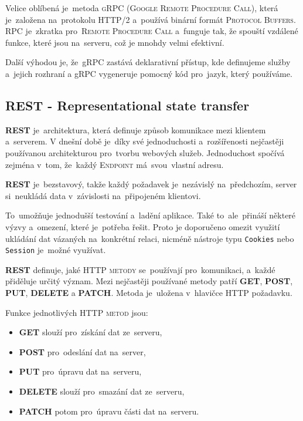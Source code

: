 \documentclass[14pt,a4paper]{article}
\begin{document}
        Velice oblíbená je~metoda \textsc{gRPC} (\textsc{Google Remote Procedure Call}), která je~založena na~protokolu HTTP/2 a~používá binární formát \textsc{Protocol Buffers}.
        RPC je~zkratka pro~\textsc{Remote Procedure Call} a~funguje tak, že spouští vzdálené funkce, které jsou na~serveru, což je mnohdy velmi efektivní.
        
        Další výhodou je, že~gRPC zastává deklarativní přístup, kde definujeme služby a~jejich rozhraní a gRPC vygeneruje pomocný kód pro~jazyk, který používáme.\parencite{thenewstackBuildRealWorld}

        \subsection{REST - Representational state transfer}
        \textbf{REST} je~architektura, která definuje způsob komunikace mezi klientem a~serverem.
        V dnešní době je~díky své jednoduchosti a~rozšířenosti nejčastěji používanou architekturou pro~tvorbu webových služeb. Jednoduchost spočívá zejména v~tom, že~každý \textsc{Endpoint} má~svou~vlastní adresu.
        
        \textbf{REST} je~bezstavový, takže každý požadavek je~nezávislý na~předchozím, server si~neukládá data v~závislosti na~připojeném klientovi.
        
        To~umožňuje jednodušší testování a~ladění aplikace. Také to~ale~přináší některé výzvy a~omezení, které je~potřeba řešit. Proto je doporučeno omezit využití ukládání dat vázaných na~konkrétní relaci, nicméně nástroje typu \texttt{Cookies} nebo \texttt{Session} je~možné využívat.
        
        \textbf{REST} definuje, jaké \textsc{HTTP metody} se~používají pro~komunikaci, a~každé přiděluje určitý význam. Mezi nejčastěji používané metody patří \textbf{GET}, \textbf{POST}, \textbf{PUT}, \textbf{DELETE} a \textbf{PATCH}. Metoda je~uložena v~hlavičce HTTP požadavku.

        Funkce jednotlivých \textsc{HTTP metod} jsou:
        \begin{itemize}
            \item \textbf{GET} slouží pro~získání dat ze~serveru,
            \item \textbf{POST} pro~odeslání dat na~server,
            \item \textbf{PUT} pro~úpravu dat na~serveru,
            \item \textbf{DELETE} slouží pro~smazání dat ze~serveru,
            \item \textbf{PATCH} potom pro~úpravu části dat na~serveru.
        \end{itemize}
\end{document}
